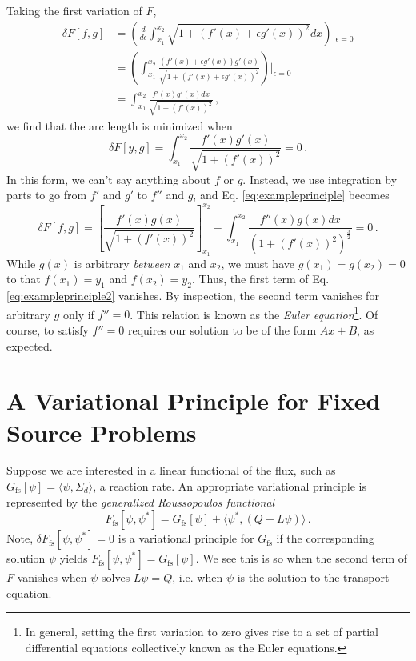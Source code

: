Taking the first variation of $F$,
\begin{equation}
\begin{split}
\delta F[f,g] &= \left ( \frac{d}{d\epsilon}\int^{x_2}_{x_1} 
                         \sqrt{1 + (f'(x)+\epsilon g'(x))^2} dx \right ) 
                 \Bigg |_{\epsilon=0} \\
              &= \left ( \int^{x_2}_{x_1} 
                         \frac{(f'(x)+\epsilon g'(x))g'(x)}
                              {\sqrt{1 + (f'(x)+\epsilon g'(x))^2}} \right ) 
                 \Bigg |_{\epsilon=0} \\
              &= \int^{x_2}_{x_1} \frac{f'(x)g'(x)dx}{\sqrt{1 + (f'(x))^2}} \, ,
\end{split}
\end{equation}
we find that the arc length is minimized when
\begin{equation}
 \delta F[y,g] =
   \int^{x_2}_{x_1}\frac{f'(x)g'(x)}{\sqrt{1 + (f'(x))^2}} = 0 \, .
 \label{eq:exampleprinciple}
\end{equation}
In this form, we can't say anything about $f$ or $g$.  Instead, we use 
integration by parts to go from $f'$ and $g'$ to $f''$ and $g$, and
Eq. \ref{eq:exampleprinciple} becomes
\begin{equation}
 \delta F[f,g] =
   \left [ \frac{f'(x)g(x)}{\sqrt{1 + (f'(x))^2}} \right ]^{x_2}_{x_1} - 
   \int^{x_2}_{x_1} \frac{f''(x)g(x)dx}{(1 + (f'(x))^2)^{\frac{3}{2}}} = 0\, .
 \label{eq:exampleprinciple2}
\end{equation}
While $g(x)$ is arbitrary \textit{between} $x_1$ and $x_2$, we must have 
$g(x_1) = g(x_2) = 0$ to that $f(x_1) = y_1$ and $f(x_2) = y_2$.  Thus, the 
first term of Eq. \ref{eq:exampleprinciple2} vanishes. 
By inspection, the second term vanishes for 
arbitrary $g$ only if $f'' = 0$.  This relation is known as 
the \textit{Euler equation}\footnote{In general, setting the first variation 
to zero gives rise to a set of partial differential equations collectively 
known as the Euler equations.}.  Of course, to satisfy $f''=0$ requires 
our solution to be of the form $Ax+B$, as expected.

\section*{A Variational Principle for Fixed Source Problems}

Suppose we are interested in a linear functional of the flux, such 
as $G_{\text{fs}}[\psi] = \langle \psi, \Sigma_d \rangle$, a reaction rate. 
An appropriate variational principle is represented by 
the \textit{generalized Roussopoulos functional}
\begin{equation}
 F_{\text{fs}} [\psi,\psi^*] = 
   G_{\text{fs}}[\psi] + \langle \psi^*, (Q-L\psi) \rangle \, .
\end{equation}
Note, $\delta F_{\text{fs}}[\psi,\psi^*] = 0$ is a variational principle 
for $G_{\text{fs}}$ if the corresponding solution $\psi$ 
yields $F_{\text{fs}}[\psi,\psi^*] = G_{\text{fs}}[\psi]$.  We see this is 
so when the second term of $F$ vanishes when $\psi$ solves $L\psi = Q$, i.e. 
when $\psi$ is the solution to the transport equation.

